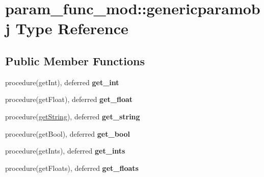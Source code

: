 \hypertarget{structparam__func__mod_1_1genericparamobj}{}\section{param\+\_\+func\+\_\+mod\+:\+:genericparamobj Type Reference}
\label{structparam__func__mod_1_1genericparamobj}
\subsection*{Public Member Functions}
\begin{DoxyCompactItemize}
\item 
\mbox{\label{structparam__func__mod_1_1genericparamobj_a166dc6fccc8944c7e1e80517202297dd}} 
procedure(get\+Int), deferred {\bfseries get\+\_\+int}
\item 
\mbox{\label{structparam__func__mod_1_1genericparamobj_ac4090b423e4f5532a4f0033b03b64f4d}} 
procedure(get\+Float), deferred {\bfseries get\+\_\+float}
\item 
\mbox{\label{structparam__func__mod_1_1genericparamobj_a4ee6650ec6fcb249e4c9ea24e6b4bba9}} 
procedure(\hyperlink{interfaceparam__func__mod_1_1get_string}{get\+String}), deferred {\bfseries get\+\_\+string}
\item 
\mbox{\label{structparam__func__mod_1_1genericparamobj_a3ada7ec97c8d79213b777f1404142f4a}} 
procedure(get\+Bool), deferred {\bfseries get\+\_\+bool}
\item 
\mbox{\label{structparam__func__mod_1_1genericparamobj_ad1bd18782cd1a45b7a8958adb67e3f04}} 
procedure(get\+Ints), deferred {\bfseries get\+\_\+ints}
\item 
\mbox{\label{structparam__func__mod_1_1genericparamobj_abd4712dd03f509b38dab3d5577cc268f}} 
procedure(get\+Floats), deferred {\bfseries get\+\_\+floats}
\item 
\mbox{\label{structparam__func__mod_1_1genericparamobj_a253d5f1e674dc4583047973b974e79b0}} 

\end{DoxyCompactItemize}
